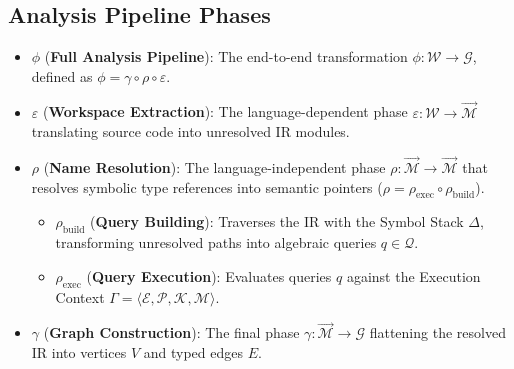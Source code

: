 \subsection{Analysis Pipeline Phases}
\begin{itemize}
  \item $\phi$ (\textbf{Full Analysis Pipeline}): The end-to-end transformation
    $\phi : \mathcal{W} \to \mathcal{G}$, defined as $\phi = \gamma
    \circ \rho \circ \varepsilon$.
  \item $\varepsilon$ (\textbf{Workspace Extraction}): The language-dependent
    phase $\varepsilon : \mathcal{W} \to \vec{\mathcal{M}}$
    translating source code into unresolved IR modules.
  \item $\rho$ (\textbf{Name Resolution}): The language-independent phase
    $\rho : \vec{\mathcal{M}} \to \vec{\mathcal{M}}$ that resolves
    symbolic type references into semantic pointers ($\rho =
    \rho_{\text{exec}} \circ \rho_{\text{build}}$).
    \begin{itemize}
      \item $\rho_{\text{build}}$ (\textbf{Query Building}):
        Traverses the IR with the Symbol Stack $\Delta$, transforming
        unresolved paths into algebraic queries $q \in \mathcal{Q}$.
      \item $\rho_{\text{exec}}$ (\textbf{Query Execution}):
        Evaluates queries $q$ against the Execution Context $\Gamma =
        \langle \mathcal{E}, \mathcal{P}, \mathcal{K}, \mathcal{M} \rangle$.
    \end{itemize}
  \item $\gamma$ (\textbf{Graph Construction}): The final phase
    $\gamma : \vec{\mathcal{M}} \to \mathcal{G}$
    flattening the resolved IR into vertices $V$ and typed edges $E$.
\end{itemize}
